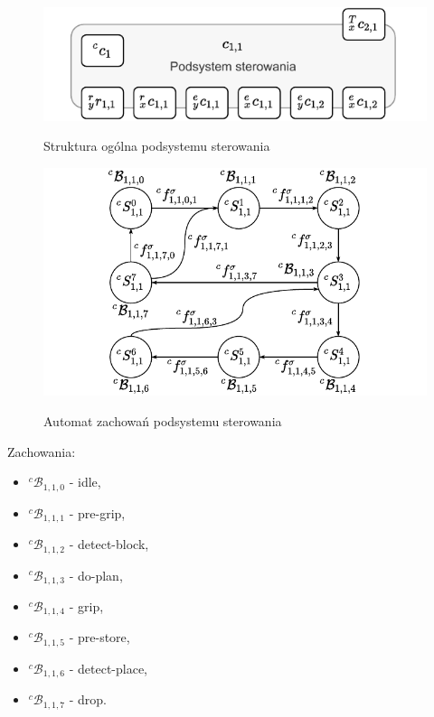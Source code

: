 \begin{figure}
    \centering
    \includegraphics[width=\columnwidth]{figures/ISR-cs-model.pdf}
    \label{fig:model-cs}
    \caption{Struktura ogólna podsystemu sterowania}
\end{figure}

\begin{figure}
    \centering
    \includegraphics[width=\columnwidth]{figures/ISR-cs-behaviours.pdf}
    \label{fig:zachowania-cs}
    \caption{Automat zachowań podsystemu sterowania}
\end{figure}

Zachowania:
\begin{itemize}
    \item ${}^{c}\mathcal{B}_{1,1,0}$ - idle,
    \item ${}^{c}\mathcal{B}_{1,1,1}$ - pre-grip,
    \item ${}^{c}\mathcal{B}_{1,1,2}$ - detect-block,
    \item ${}^{c}\mathcal{B}_{1,1,3}$ - do-plan,
    \item ${}^{c}\mathcal{B}_{1,1,4}$ - grip,
    \item ${}^{c}\mathcal{B}_{1,1,5}$ - pre-store,
    \item ${}^{c}\mathcal{B}_{1,1,6}$ - detect-place,
    \item ${}^{c}\mathcal{B}_{1,1,7}$ - drop.
\end{itemize}


